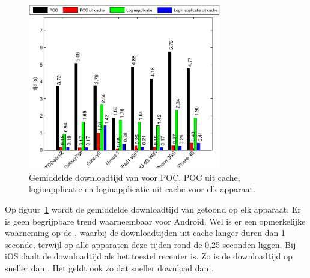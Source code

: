 
\section*{\lungo}
\label{app:performantie-lungo}

\begin{figure}
  \centering
  \includegraphics[width=0.75\textwidth]{figuren/performance-lungo.pdf}
  \caption{Gemiddelde downloadtijd van \lungo{} voor POC,  POC uit cache,  loginapplicatie en loginapplicatie uit cache voor elk apparaat.}
  \label{fig:performantie-lungo}
\end{figure}

Op figuur~\ref{fig:performantie-lungo} wordt de gemiddelde downloadtijd van \lungo{} getoond op elk apparaat.
Er is geen begrijpbare trend waarneembaar voor Android.
Wel is er een opmerkelijke waarneming op de \gs{}, waarbij de downloadtijden uit cache langer duren dan 1 seconde, terwijl op alle apparaten deze tijden rond de 0,25 seconden liggen.
Bij iOS daalt de downloadtijd als het toestel recenter is.
Zo is de downloadtijd op \ipadiii{} sneller dan \ipadi{}.
Het geldt ook zo dat \iphoneiv{} sneller download dan \iphoneiii{}.

